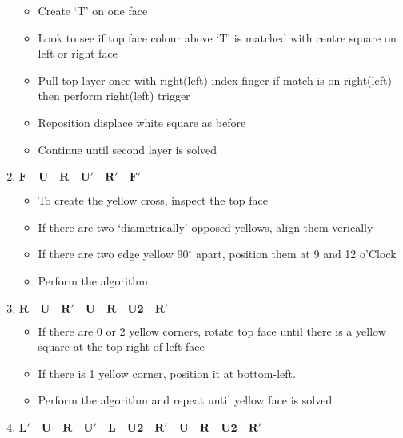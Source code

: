 \documentclass{article}
\begin{document}
\begin{enumerate}
\begin{itemize}
                  \item Create `T' on one face
                  \item Look to see if top face colour above `T' is matched with centre square on left or right face
                  \item Pull top layer once with right(left) index finger if match is on right(left) then perform right(left) trigger
                  \item Reposition displace white square as before
                  \item Continue until second layer is solved
              \end{itemize}
              \pagebreak
        \item $\mathbf{F\quad
               U\quad
               R\quad
               U'\quad
               R'\quad
               F'}$
              \begin{itemize}
                  \item To create the yellow cross, inspect the top face
                  \item If there are two `diametrically' opposed yellows, align them verically
                  \item If there are two edge yellow 90$^{\circ}$ apart, position them at 9 and 12 o'Clock
                  \item Perform the algorithm
              \end{itemize}
        \item $\mathbf{R\quad
               U\quad
               R'\quad
               U\quad
               R\quad
               U2\quad
               R'}$
              \begin{itemize}
                  \item If there are 0 or 2 yellow corners, rotate top face until there is a yellow
                        square at the top-right of left face
                  \item If there is 1 yellow corner, position it at bottom-left.
                  \item Perform the algorithm and repeat until yellow face is solved
              \end{itemize}
        \item $\mathbf{L'\quad
               U\quad
               R\quad
               U'\quad
               L\quad
               U2\quad
               R'\quad
               U\quad
               R\quad
               U2\quad
               R'}$
              \begin{itemize}

\end{itemize}
\end{enumerate}
\end{document}
